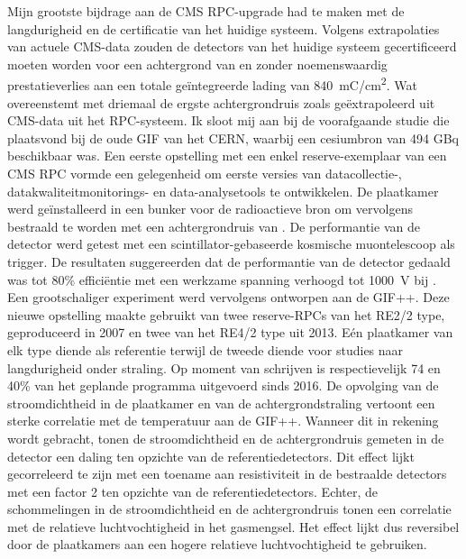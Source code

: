	Mijn grootste bijdrage aan de CMS RPC-upgrade had te maken met de langdurigheid en de certificatie van het huidige systeem. Volgens extrapolaties van actuele CMS-data zouden de detectors van het huidige systeem gecertificeerd moeten worden voor een achtergrond van  en zonder noemenswaardig prestatieverlies aan een totale geïntegreerde lading van \SI{840}{mC/cm^2}. Wat overeenstemt met driemaal de ergste achtergrondruis zoals geëxtrapoleerd uit CMS-data uit het RPC-systeem. Ik sloot mij aan bij de voorafgaande studie die plaatsvond bij de oude GIF van het CERN, waarbij een cesiumbron van 494 GBq beschikbaar was. Een eerste opstelling met een enkel reserve-exemplaar van een CMS RPC vormde een gelegenheid om eerste versies van datacollectie-, datakwaliteitmonitorings- en data-analysetools te ontwikkelen. De plaatkamer werd geïnstalleerd in een bunker voor de radioactieve bron om vervolgens bestraald te worden met een achtergrondruis van . De performantie van de detector werd getest met een scintillator-gebaseerde kosmische muontelescoop als trigger. De resultaten suggereerden dat de performantie van de detector gedaald was tot 80\% efficiëntie met een werkzame spanning verhoogd tot \SI{1000}{V} bij .\\
	Een grootschaliger experiment werd vervolgens ontworpen aan de GIF++. Deze nieuwe opstelling maakte gebruikt van twee reserve-RPCs van het RE2/2 type, geproduceerd in 2007 en twee van het RE4/2 type uit 2013. Eén plaatkamer van elk type diende als referentie terwijl de tweede diende voor studies naar langdurigheid onder straling. Op moment van schrijven is respectievelijk 74 en 40\% van het geplande programma uitgevoerd sinds 2016. De opvolging van de stroomdichtheid in de plaatkamer en van de achtergrondstraling vertoont een sterke correlatie met de temperatuur aan de GIF++. Wanneer dit in rekening wordt gebracht, tonen de stroomdichtheid en de achtergrondruis gemeten in de detector een daling ten opzichte van de referentiedetectors. Dit effect lijkt gecorreleerd te zijn met een toename aan resistiviteit in de bestraalde detectors met een factor 2 ten opzichte van de referentiedetectors. Echter, de schommelingen in de stroomdichtheid en de achtergrondruis tonen een correlatie met de relatieve luchtvochtigheid in het gasmengsel. Het effect lijkt dus reversibel door de plaatkamers aan een hogere relatieve luchtvochtigheid te gebruiken.\\
